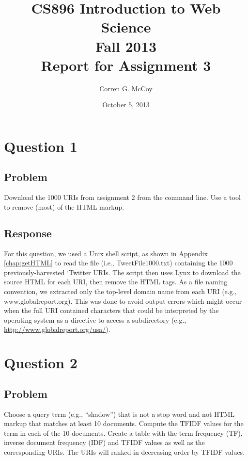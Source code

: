 \documentclass[letterpaper,11pt]{report}
\begin{document}
 
\begin{savenotes}
\pagestyle{plain}
\title{CS896 Introduction to Web Science\\Fall 2013\\Report for Assignment 3}
\author{Corren G. McCoy}
 
\date{October 5, 2013}
\maketitle

\renewcommand*\thesection{\arabic{section}}
\setcounter{section}{0}

\setcounter{tocdepth}{4}
\tableofcontents
 \listoffigures
 \listoftables
\newpage


\section{Question 1}
\subsection{Problem}Download the 1000 URIs from assignment 2 from the command line. Use a tool to remove (most) of the HTML markup.
\subsection{Response}For this question, we used a Unix shell script, as shown in Appendix \ref{chap:getHTML} to read the file (i.e., TweetFile1000.txt) containing the 1000 previously-harvested `Twitter URIs. The script then uses Lynx to download the source HTML for each URI, then remove the HTML tags. As a file naming convention, we extracted only the top-level domain name from each URI (e.g., www.globalreport.org).  This was done to avoid output errors which might occur when the full URI contained characters that could be interpreted by the operating system as a directive to access a subdirectory (e.g., \url{http://www.globalreport.org/usa/}).

\section{Question 2}
\subsection{Problem}Choose a query term (e.g., ``shadow'') that is not a stop word and not HTML markup that matches at least 10 documents. Compute the TFIDF values for the term in each of the 10 documents. Create a table with the term frequency (TF), inverse document frequency (IDF) and TFIDF values as well as the corresponding URIs. The URIs will ranked in decreasing order by TFIDF values.

\end{savenotes}
\end{document}
